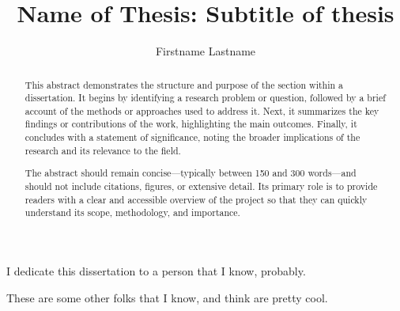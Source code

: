 \documentclass[12pt]{yorkudiss}
\title{Name of Thesis: Subtitle of thesis}
\author{Firstname Lastname}
\begin{document}
\frontmatter
\maketitle{}
\makecommittee{}


\begin{abstract}

This abstract demonstrates the structure and purpose of the section within a dissertation. It begins by identifying a research problem or question, followed by a brief account of the methods or approaches used to address it. Next, it summarizes the key findings or contributions of the work, highlighting the main outcomes. Finally, it concludes with a statement of significance, noting the broader implications of the research and its relevance to the field.

The abstract should remain concise—typically between 150 and 300 words—and should not include citations, figures, or extensive detail. Its primary role is to provide readers with a clear and accessible overview of the project so that they can quickly understand its scope, methodology, and importance.

\end{abstract}


\begin{dedication}
I dedicate this dissertation to a person that I know, probably. 
\end{dedication}


\begin{acknowledgements}
These are some other folks that I know, and think are pretty cool. 

\end{acknowledgements}
\end{document}
